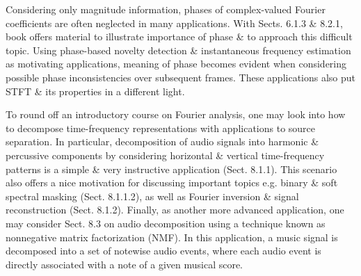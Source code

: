 \documentclass{article}
\begin{document}
\begin{itemize}
\begin{itemize}
		Considering only magnitude information, phases of complex-valued Fourier coefficients are often neglected in many applications. With Sects. 6.1.3 \& 8.2.1, book offers material to illustrate importance of phase \& to approach this difficult topic. Using phase-based novelty detection \& instantaneous frequency estimation as motivating applications, meaning of phase becomes evident when considering possible phase inconsistencies over subsequent frames. These applications also put STFT \& its properties in a different light.
		
		To round off an introductory course on Fourier analysis, one may look into how to decompose time-frequency representations with applications to source separation. In particular, decomposition of audio signals into harmonic \& percussive components by considering horizontal \& vertical time-frequency patterns is a simple \& very instructive application (Sect. 8.1.1). This scenario also offers a nice motivation for discussing important topics e.g. binary \& soft spectral masking (Sect. 8.1.1.2), as well as Fourier inversion \& signal reconstruction (Sect. 8.1.2). Finally, as another more advanced application, one may consider Sect. 8.3 on audio decomposition using a technique known as nonnegative matrix factorization (NMF). In this application, a music signal is decomposed into a set of notewise audio events, where each audio event is directly associated with a note of a given musical score.
		

\end{itemize}
\end{itemize}
\end{document}
